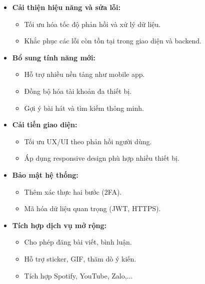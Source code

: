 \documentclass[a4paper]{article}
\begin{document}
\begin{itemize}
    \item \textbf{Cải thiện hiệu năng và sửa lỗi:}
    \begin{itemize}
        \item Tối ưu hóa tốc độ phản hồi và xử lý dữ liệu.
        \item Khắc phục các lỗi còn tồn tại trong giao diện và backend.
    \end{itemize}
    
    \item \textbf{Bổ sung tính năng mới:}
    \begin{itemize}
        \item Hỗ trợ nhiều nền tảng như mobile app.
        \item Đồng bộ hóa tài khoản đa thiết bị.
        \item Gợi ý bài hát và tìm kiếm thông minh.
    \end{itemize}
    
    \item \textbf{Cải tiến giao diện:}
    \begin{itemize}
        \item Tối ưu UX/UI theo phản hồi người dùng.
        \item Áp dụng responsive design phù hợp nhiều thiết bị.
    \end{itemize}
    
    \item \textbf{Bảo mật hệ thống:}
    \begin{itemize}
        \item Thêm xác thực hai bước (2FA).
        \item Mã hóa dữ liệu quan trọng (JWT, HTTPS).
    \end{itemize}
    
    \item \textbf{Tích hợp dịch vụ mở rộng:}
    \begin{itemize}
        \item Cho phép đăng bài viết, bình luận.
        \item Hỗ trợ sticker, GIF, thăm dò ý kiến.
        \item Tích hợp Spotify, YouTube, Zalo,...
    \end{itemize}
\end{itemize}
\end{document}
